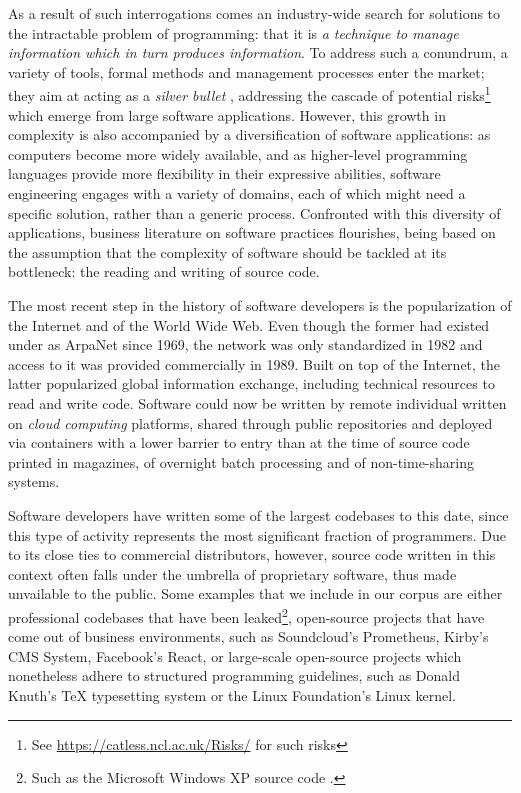 As a result of such interrogations comes an industry-wide search for solutions to the intractable problem of programming: that it is \emph{a technique to manage information which in turn produces information}. To address such a conundrum, a variety of tools, formal methods and management processes enter the market; they aim at acting as a \emph{silver bullet} \citep{brooks_mythical_1975}, addressing the cascade of potential risks\footnote{See \url{https://catless.ncl.ac.uk/Risks/} for such risks} which emerge from large software applications. However, this growth in complexity is also accompanied by a diversification of software applications: as computers become more widely available, and as higher-level programming languages provide more flexibility in their expressive abilities, software engineering engages with a variety of domains, each of which might need a specific solution, rather than a generic process. Confronted with this diversity of applications, business literature on software practices flourishes, being based on the assumption that the complexity of software should be tackled at its bottleneck: the reading and writing of source code.

The most recent step in the history of software developers is the popularization of the Internet and of the World Wide Web. Even though the former had existed under as ArpaNet since 1969, the network was only standardized in 1982 and access to it was provided commercially in 1989. Built on top of the Internet, the latter popularized global information exchange, including technical resources to read and write code. Software could now be written by remote individual written on \emph{cloud computing} platforms, shared through public repositories and deployed via containers with a lower barrier to entry than at the time of source code printed in magazines, of overnight batch processing and of non-time-sharing systems.

\vspace{1\baselineskip}

Software developers have written some of the largest codebases to this date, since this type of activity represents the most significant fraction of programmers. Due to its close ties to commercial distributors, however, source code written in this context often falls under the umbrella of proprietary software, thus made unvailable to the public. Some examples that we include in our corpus are either professional codebases that have been leaked\footnote{Such as the Microsoft Windows XP source code \citep{warren_windows_2020}.}, open-source projects that have come out of business environments, such as Soundcloud's Prometheus, Kirby's CMS System, Facebook's React, or large-scale open-source projects which nonetheless adhere to structured programming guidelines, such as Donald Knuth's TeX typesetting system or the Linux Foundation's Linux kernel.

